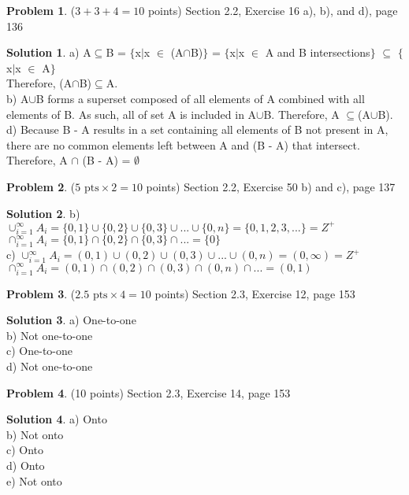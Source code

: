 \documentclass{article}
\theoremstyle{definition}
\newtheorem{problem}{Problem}
\newtheorem*{solution}{Solution}
\begin{document}
\begin{problem} ($3+3+4 = 10$ points)
Section 2.2, Exercise 16 a), b), and d), page 136
\end{problem}
\begin{solution} 
a) A$\subseteq$B = $\{$x$\mid$x $\in$ (A$\cap$B)$\}$ = $\{$x$\mid$x $\in$ A and B intersections$\}$ $\subseteq$ $\{$x$\mid$x $\in$ A$\}$
\\Therefore, (A$\cap$B)$\subseteq$A.
\\b) A$\cup$B forms a superset composed of all elements of A combined with all elements of B. As such, all of set A is included in A$\cup$B. Therefore, A $\subseteq$(A$\cup$B).
\\d) Because B - A results in a set containing all elements of B not present in A, there are no common elements left between A and (B - A) that intersect. Therefore, A $\cap$ (B - A) = $\emptyset$
\end{solution}

\begin{problem} ($5 \mbox{ pts} \times 2 = 10$ points)
Section 2.2, Exercise 50 b) and c), page 137
\end{problem}
\begin{solution} 
b) $\cup_{i=1}^\infty A_i = \{0,1\}\cup \{0,2\}\cup \{0,3\}\cup...\cup\{0,n\} = \{0,1,2,3,...\}=Z^+$
\\ $\cap_{i=1}^\infty A_i = \{0,1\}\cap \{0,2\}\cap \{0,3\}\cap... = \{0\}$
\\c)  $\cup_{i=1}^\infty A_i = (0,1)\cup (0,2)\cup (0,3)\cup...\cup(0,n) = (0,\infty)=Z^+$
\\$\cap_{i=1}^\infty A_i = (0,1)\cap (0,2)\cap (0,3)\cap (0,n)\cap... = (0,1)$
\end{solution}

\begin{problem} ($2.5 \mbox{ pts} \times 4 = 10$ points)
Section 2.3, Exercise 12, page 153
\end{problem}
\begin{solution} 
a) One-to-one
\\b) Not one-to-one
\\c) One-to-one
\\d) Not one-to-one
\end{solution}

\begin{problem} (10 points)
Section 2.3, Exercise 14, page 153
\end{problem}
\begin{solution} 
a) Onto
\\b) Not onto
\\c) Onto
\\d) Onto
\\e) Not onto
\end{solution}
\end{document}
